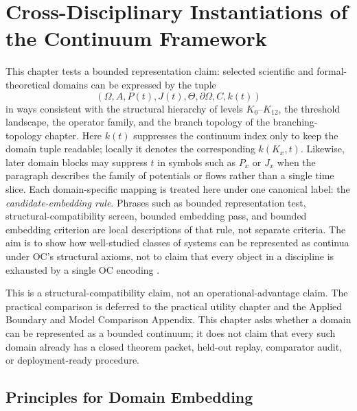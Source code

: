 
\section{Cross-Disciplinary Instantiations of the Continuum Framework}
\label{sec:disciplines-extended}

This chapter tests a bounded representation claim: selected scientific and
formal-theoretical domains can be expressed by the tuple
\[
  (\Omega, A, P(t), J(t), \Theta, \partial\Omega, C, k(t))
\]
in ways consistent with the structural hierarchy of levels
\(K_0\)–\(K_{12}\), the threshold landscape, the operator family, and the
branch topology of the branching-topology chapter.  
Here \(k(t)\) suppresses the continuum index only to keep the domain tuple
readable; locally it denotes the corresponding \(k(K_x,t)\).
Likewise, later domain blocks may suppress \(t\) in symbols such as \(P_x\)
or \(J_x\) when the paragraph describes the family of potentials or flows
rather than a single time slice.
Each domain-specific mapping is treated here under one canonical label: the
\emph{candidate-embedding rule}. Phrases such as bounded representation test,
structural-compatibility screen, bounded embedding pass, and bounded embedding
criterion are local descriptions of that rule, not separate criteria. The aim
is to show how well-studied classes of systems can
be represented as continua under OC's structural axioms, not to claim that
every object in a discipline is exhausted by a single OC encoding
\parencite{anderson_more_is_different}.

This is a structural-compatibility claim, not an operational-advantage claim.
The practical comparison is deferred to
the practical utility chapter and
the Applied Boundary and Model Comparison Appendix. This chapter asks
whether a domain can be represented as a bounded continuum; it does not claim
that every such domain already has a closed theorem packet, held-out replay,
comparator audit, or deployment-ready procedure.

\subsection{Principles for Domain Embedding}

